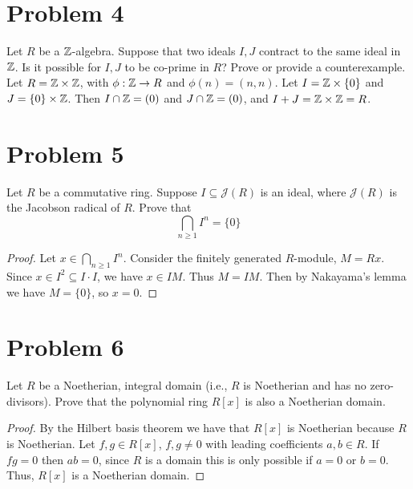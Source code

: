 \documentclass[12pt]{article}
\begin{document}
\section*{Problem 4}
Let $R$ be a $\mathbb{Z}$-algebra. Suppose that two ideals $I, J$ contract to the same ideal in $\mathbb{Z}$. Is it possible for $I, J$ to be co-prime in $R$? Prove or provide a counterexample.\\
Let $R=\mathbb{Z}\times\mathbb{Z}$, with $\phi:\mathbb{Z}\to R$ and $\phi(n)=(n,n)$. Let $I=\mathbb{Z}\times\{0\}$ and $J=\{0\}\times\mathbb{Z}$. Then $I\cap\mathbb{Z}=(0)$ and $J\cap\mathbb{Z}=(0)$, and $I+J=\mathbb{Z}\times\mathbb{Z}=R$.

\section*{Problem 5}
Let $R$ be a commutative ring. Suppose $I \subseteq \mathcal{J}(R)$ is an ideal, where $\mathcal{J}(R)$ is the Jacobson radical of $R$. Prove that
\[
    \bigcap_{n\geq1}I^n=\{0\}
\]
\begin{proof}
	Let $x\in\bigcap_{n\geq1}I^n$. Consider the finitely generated $R$-module, $M=Rx$. Since $x\in I^2\subseteq I\cdot I$, we have $x\in IM$. Thus $M=IM$. Then by Nakayama's lemma we have $M=\{0\}$, so $x=0$. 
\end{proof}
\section*{Problem 6}
Let $R$ be a Noetherian, integral domain (i.e., $R$ is Noetherian and has no zero-divisors). Prove that the polynomial ring $R[x]$ is also a Noetherian domain.
\begin{proof}
	By the Hilbert basis theorem we have that $R[x]$ is Noetherian because $R$ is Noetherian. Let $f,g\in R[x]$, $f,g\neq0$ with leading coefficients $a,b\in R$. If $fg=0$ then $ab=0$, since $R$ is a domain this is only possible if $a=0$ or $b=0$. Thus, $R[x]$ is a Noetherian domain. 
\end{proof}
\end{document}
